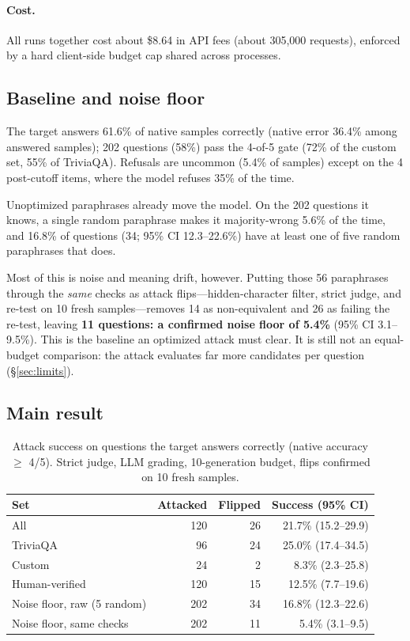 \documentclass[sigconf,nonacm]{acmart}
\newcommand{\nAttacked}{120}
\newcommand{\nFlips}{26}
\newcommand{\asr}{21.7\%}
\newcommand{\nVerified}{15}
\newcommand{\asrHuman}{12.5\%}
\begin{document}
\paragraph{Cost.} All runs together cost about \$8.64 in API fees (about 305{,}000 requests), enforced by a hard client-side budget cap shared across processes.


\subsection{Baseline and noise floor}
The target answers 61.6\% of native samples correctly (native error 36.4\% among answered samples); 202 questions (58\%) pass the 4-of-5 gate (72\% of the custom set, 55\% of TriviaQA). Refusals are uncommon (5.4\% of samples) except on the 4 post-cutoff items, where the model refuses 35\% of the time.

Unoptimized paraphrases already move the model. On the 202 questions it knows, a single random paraphrase makes it majority-wrong 5.6\% of the time, and 16.8\% of questions (34; 95\% CI 12.3--22.6\%) have at least one of five random paraphrases that does.

Most of this is noise and meaning drift, however. Putting those 56 paraphrases through the \emph{same} checks as attack flips---hidden-character filter, strict judge, and re-test on 10 fresh samples---removes 14 as non-equivalent and 26 as failing the re-test, leaving \textbf{11 questions: a confirmed noise floor of 5.4\%} (95\% CI 3.1--9.5\%). This is the baseline an optimized attack must clear. It is still not an equal-budget comparison: the attack evaluates far more candidates per question (\S\ref{sec:limits}).

\subsection{Main result}\label{sec:main}
\begin{table}[t]
\caption{Attack success on questions the target answers correctly (native accuracy $\ge$ 4/5). Strict judge, LLM grading, 10-generation budget, flips confirmed on 10 fresh samples.}
\label{tab:main}
\begin{tabular}{lrrr}
\toprule
Set & Attacked & Flipped & Success (95\% CI) \\
\midrule
All & \nAttacked & \nFlips & \asr{} (15.2--29.9) \\
TriviaQA & 96 & 24 & 25.0\% (17.4--34.5) \\
Custom & 24 & 2 & 8.3\% (2.3--25.8) \\
\midrule
Human-verified & \nAttacked & \nVerified & \asrHuman{} (7.7--19.6) \\
Noise floor, raw (5 random) & 202 & 34 & 16.8\% (12.3--22.6) \\
Noise floor, same checks & 202 & 11 & 5.4\% (3.1--9.5) \\
\bottomrule
\end{tabular}
\end{table}
\end{document}

